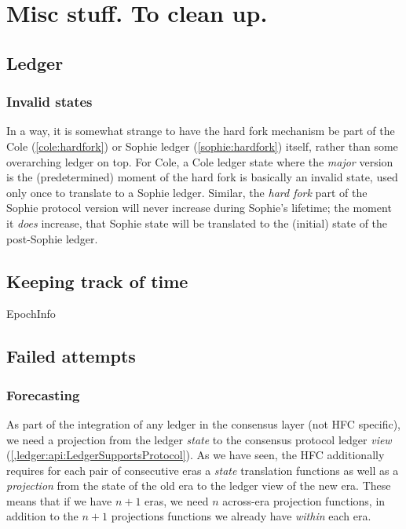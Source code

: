 \chapter{Misc stuff. To clean up.}
\label{hfc:misc}


\section{Ledger}

\subsection{Invalid states}
\label{hfc:ledger:invalid-states}

In a way, it is somewhat strange to have the hard fork mechanism be part of the
Cole (\cref{cole:hardfork}) or Sophie ledger (\cref{sophie:hardfork})
itself, rather than some overarching ledger on top. For Cole, a Cole ledger
state where the \emph{major} version is the (predetermined) moment of the hard
fork is basically an invalid state, used only once to translate to a Sophie
ledger. Similar, the \emph{hard fork} part of the Sophie protocol version will
never increase during Sophie's lifetime; the moment it \emph{does} increase,
that Sophie state will be translated to the (initial) state of the post-Sophie
ledger.

\section{Keeping track of time}
\label{hfc:time}

EpochInfo

\section{Failed attempts}

\subsection{Forecasting}
\label{hfc:failed:forecasting}

As part of the integration of any ledger in the consensus layer (not HFC
specific), we need a projection from the ledger \emph{state} to the consensus
protocol ledger \emph{view}
(\cref{,ledger:api:LedgerSupportsProtocol}).
As we have seen,
the HFC additionally requires for each pair of consecutive eras a  \emph{state}
translation functions as well as a \emph{projection} from the state of the old
era to the ledger view of the new era. These means that if we have $n + 1$ eras,
we need $n$ across-era projection functions, in addition to the $n + 1$
projections functions we already have \emph{within} each era.


